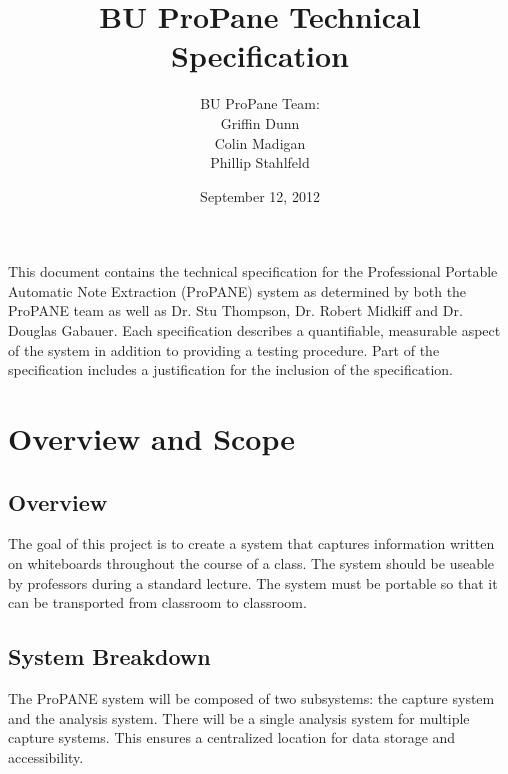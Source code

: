 \documentclass[]{article}
\begin{document}
	\begin{titlepage}



		\title{\textbf{BU ProPane Technical Specification}}
		\author{BU ProPane Team:\\Griffin Dunn\\Colin Madigan\\Phillip Stahlfeld}
		\date{September 12, 2012}
		\maketitle



		\noindent
		This document contains the technical specification for the Professional Portable Automatic Note Extraction (ProPANE) system as determined by both the ProPANE team as well as Dr. Stu Thompson, Dr. Robert Midkiff and Dr. Douglas Gabauer. Each specification describes a quantifiable, measurable aspect of the system in addition to providing a testing procedure. Part of the specification includes a justification for the inclusion of the specification. 
		\thispagestyle{empty}
		
		
		
	\end{titlepage}
	
	
	
	\tableofcontents
	\newpage
	
	
	\setcounter{page}{1}
	\thispagestyle{empty}
	
	\section{Overview and Scope}
	
		\subsection{Overview}
			The goal of this project is to create a system that captures information written on whiteboards throughout the course of a class. The system should be useable by professors during a standard lecture. The system must be portable so that it can be transported from classroom to classroom.
			
		\subsection{System Breakdown}
			The ProPANE system will be composed of two subsystems: the capture system and the analysis system. There will be a single analysis system for multiple capture systems. This ensures a centralized location for data storage and accessibility.
			
\end{document}
